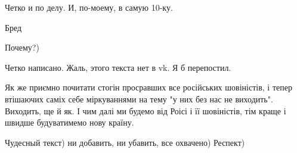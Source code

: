 \begin{itemize}
Четко и по делу. И, по-моему, в самую 10-ку.

Бред

\begin{itemize} %
Почему?)
\end{itemize} %


Четко написано. Жаль, этого текста нет в vk. Я б перепостил.


Як же приємно почитати стогін просравших все російських шовіністів, і тепер
втішаючих саміх себе міркуваннями на тему "у них без нас не виходить".
Виходить, ще й як. І чим далі ми будемо від Роісі і її шовіністів, тім краще і
швидше будуватимемо нову країну.


Чудесный текст) ни добавить, ни убавить, все охвачено) Респект)

\end{itemize} %
